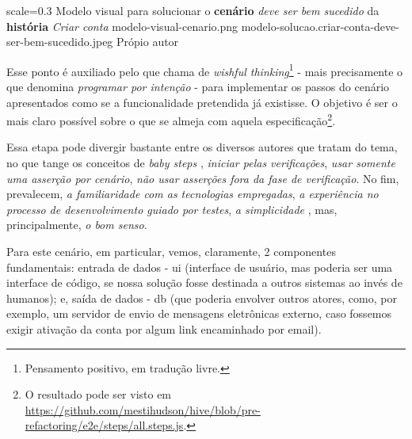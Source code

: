   \imagem
    {scale=0.3}
    {Modelo visual para solucionar o \textbf{cenário} \emph{deve ser bem sucedido} da \textbf{história} \emph{Criar conta}}
    {modelo-visual-cenario.png}
    {modelo-solucao.criar-conta-deve-ser-bem-sucedido.jpeg}
    {Própio autor\footnotemark}

  Esse ponto é auxiliado pelo que  chama de \emph{wishful thinking}\footnote{Pensamento positivo, em tradução livre.} - mais precisamente o que  denomina \emph{programar por intenção} - para implementar os passos do cenário apresentados como se a funcionalidade pretendida já existisse. O objetivo é ser o mais claro possível sobre o que se almeja com aquela especificação\footnote{O resultado pode ser visto em \url{https://github.com/mestihudson/hive/blob/pre-refactoring/e2e/steps/all.steps.js}.}.

  Essa etapa pode divergir bastante entre os diversos autores que tratam do tema, no que tange os conceitos de \emph{baby steps} \cite[pág. 1]{Aniche2011}, \emph{iniciar pelas verificações}, \emph{usar somente uma asserção por cenário}, \emph{não usar asserções fora da fase de verificação}. No fim, prevalecem, \emph{a familiaridade com as tecnologias empregadas}, \emph{a experiência no processo de desenvolvimento guiado por testes}, \emph{a simplicidade} \cite[pág. xii]{Beck2003}, mas, principalmente, \emph{o bom senso}.


  Para este cenário, em particular, vemos, claramente, 2 componentes fundamentais: entrada de dados - ui (interface de usuário, mas poderia ser uma interface de código, se nossa solução fosse destinada a outros sistemas ao invés de humanos); e, saída de dados - db (que poderia envolver outros atores, como, por exemplo, um servidor de envio de mensagens eletrônicas externo, caso fossemos exigir ativação da conta por algum link encaminhado por email).

